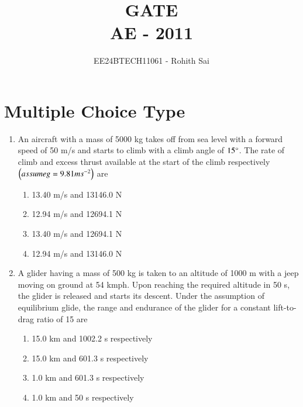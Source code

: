 \documentclass[journal]{IEEEtran}
\begin{document}

\vspace{3cm}

\title{GATE\\AE - 2011}
\author{EE24BTECH11061 - Rohith Sai}
\maketitle

\renewcommand{\thefigure}{\theenumi}
\renewcommand{\thetable}{\theenumi}

\section*{Multiple Choice Type}
\begin{enumerate}
\item An aircraft with a mass of 5000 kg takes off from sea level with a forward speed of 50 m/s and starts to climb with a climb angle of $15 \degree$. The rate of climb and excess thrust available at the start of the climb respectively $\left(assume g = 9.81 ms^{-2}\right)$ are
\begin{multicols}{2}
    \begin{enumerate}
        \item 13.40 m/s and 13146.0 N
        \item 12.94 m/s and 12694.1 N
        \item 13.40 m/s and 12694.1 N
        \item 12.94 m/s and 13146.0 N
    \end{enumerate}
\end{multicols}

\item A glider having a mass of 500 kg is taken to an altitude of 1000 m with a jeep moving on ground at 54 kmph. Upon reaching the required altitude in 50 s, the glider is released and starts its descent. Under the assumption of equilibrium glide, the range and endurance of the glider for a constant lift-to-drag ratio of 15 are
\begin{multicols}{2}
    \begin{enumerate}
        \item 15.0 km and 1002.2 s respectively
        \item 15.0 km and 601.3 s respectively
        \item 1.0 km and 601.3 s respectively
        \item 1.0 km and 50 s respectively
    \end{enumerate}
\end{multicols}
    

\end{enumerate}
\end{document}

